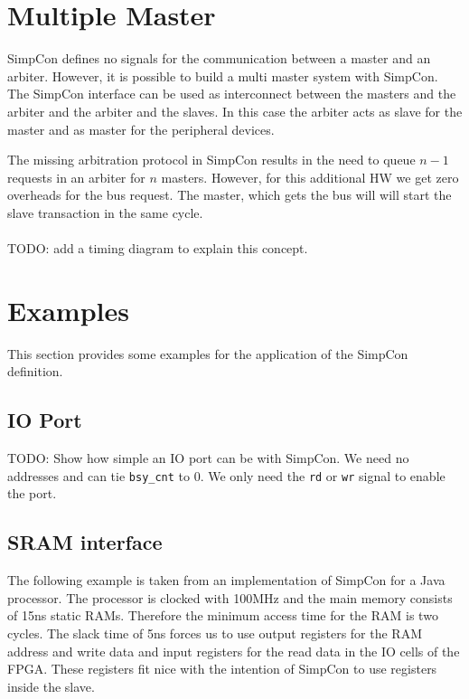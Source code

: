 \documentclass[a4paper,12pt]{scrartcl}
\newcommand{\sign}[1]{{\texttt{#1}}}
\begin{document}
\section{Multiple Master}

SimpCon defines no signals for the communication between a master
and an arbiter. However, it is possible to build a multi master
system with SimpCon. The SimpCon interface can be used as
interconnect between the masters and the arbiter and the arbiter and
the slaves. In this case the arbiter acts as slave for the master
and as master for the peripheral devices.

The missing arbitration protocol in SimpCon results in the need to
queue $n-1$ requests in an arbiter for $n$ masters. However, for
this additional HW we get zero overheads for the bus request. The
master, which gets the bus will will start the slave transaction in
the same cycle.
\\
\\
TODO: add a timing diagram to explain this concept.


\section{Examples}

This section provides some examples for the application of the
SimpCon definition.

\subsection{IO Port}

TODO: Show how simple an IO port can be with SimpCon. We need no
addresses and can tie \sign{bsy\_cnt} to 0. We only need the
\sign{rd} or \sign{wr} signal to enable the port.

\subsection{SRAM interface}

The following example is taken from an implementation of SimpCon for
a Java processor. The processor is clocked with 100MHz and the main
memory consists of 15ns static RAMs. Therefore the minimum access
time for the RAM is two cycles. The slack time of 5ns forces us to
use output registers for the RAM address and write data and input
registers for the read data in the IO cells of the FPGA. These
registers fit nice with the intention of SimpCon to use registers
inside the slave.
\end{document}
